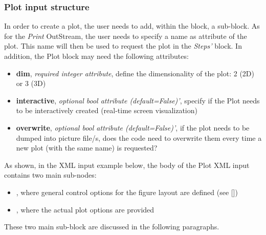 \subsubsection{Plot input structure \label{sec:PlotInputStructure}}
In order to create a plot, the user needs to add, within the
 block, a  sub-block.
%
As for the \textit{Print} OutStream, the user needs to specify a name as
attribute of the plot.
%
This name will then be used to request the plot in the \textit{Steps'} block.
%
In addition, the Plot block may need the following attributes:
\vspace{-5mm}
\begin{itemize}
  \itemsep0em
  \item \textbf{dim}, \textit{required integer attribute}, define the
  dimensionality of the plot: 2 (2D) or 3 (3D)
  \item \textbf{interactive}, \textit{optional bool attribute (default=False)'},
  specify if the Plot needs to be interactively created (real-time screen
  visualization)
  \item \textbf{overwrite}, \textit{optional bool attribute (default=False)'},
  if the plot needs to be dumped into picture file/s, does the code need to
  overwrite them every time a new plot (with the same name) is requested?
\end{itemize}
\vspace{-5mm}

As shown, in the XML input example below, the body of the Plot XML input
contains two main sub-nodes:
\vspace{-5mm}
\begin{itemize}
  \itemsep0em
  \item{}, where general control options for the figure layout are
  defined (see [])
  \item {}, where the actual plot options are provided
  \vspace{-5mm}
\end{itemize}
These two main sub-block are discussed in the following paragraphs.
%
